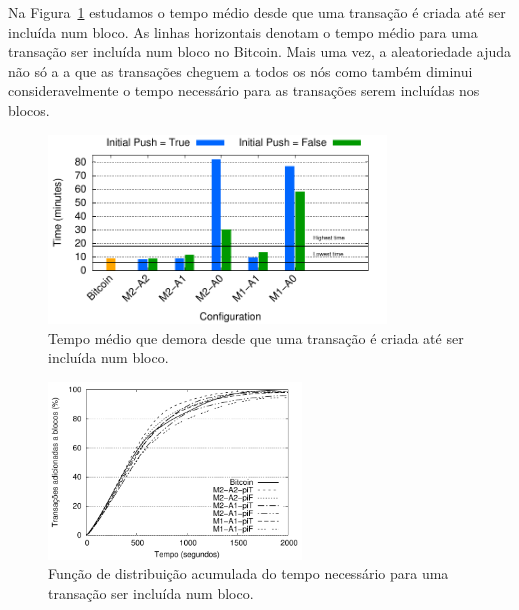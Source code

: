 Na Figura~\ref{fig:commit-time} estudamos o tempo médio desde que uma transação é criada até ser incluída num bloco. As linhas horizontais denotam o tempo médio para uma transação ser incluída num bloco no Bitcoin.
Mais uma vez, a aleatoriedade ajuda não só a a que as transações cheguem a todos os nós como também diminui consideravelmente o tempo necessário para as transações serem incluídas nos blocos.
\vspace{-0.6cm}

\begin{figure}
\centering
\includegraphics[width=0.8\textwidth]{plots/commit-time.pdf}
\caption{Tempo médio que demora desde que uma transação é criada até ser incluída num bloco.}
\label{fig:commit-time}
\vspace{-1.5cm}
\end{figure}


\begin{figure}
\centering
\includegraphics[width=0.6\textwidth]{plots/cdf_commit_2000.pdf}
\caption{Função de distribuição acumulada do tempo necessário para uma transação ser incluída num bloco.}
\label{fig:cdf-commit}
\vspace{-0.5cm}
\end{figure}

